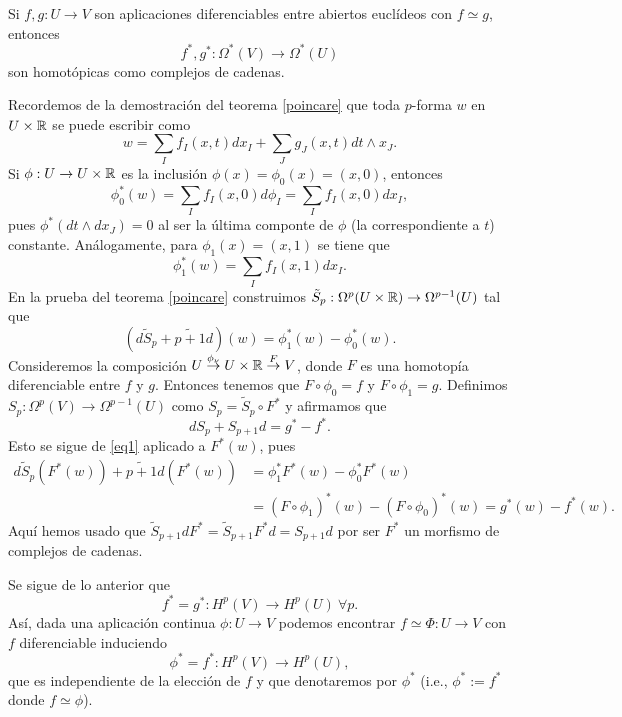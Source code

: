 \documentclass[CV.tex]{subfiles}
\begin{document}
\begin{teorema}
Si $f,g:U→V$ son aplicaciones diferenciables entre abiertos euclídeos con $f≃g$, entonces
$$f^*,g^*:Ω^*(V)→Ω^*(U)$$
son homotópicas como complejos de cadenas.
\end{teorema}
\begin{dem}
Recordemos de la demostración del teorema \ref{poincare} que toda $p$-forma $w$ en $U\times\mathbb{R}$ se puede escribir como 
\[
w=\sum_If_I(x,t)dx_I+\sum_Jg_J(x,t)dt\land x_J.
\]
Si $\phi:U\to U\times\mathbb{R}$ es la inclusión $\phi(x)=\phi_0(x)=(x,0)$, entonces
\[
\phi_0^*(w)=\sum_If_I(x,0)d\phi_I=\sum_I f_I(x,0)dx_I,
\]
pues $\phi^*(dt\land dx_J)=0$ al ser la última componte de $\phi$ (la correspondiente a $t$) constante. Análogamente, para $\phi_1(x)=(x,1)$ se tiene que
\[
\phi_1^*(w)=\sum_I f_I(x,1)dx_I.
\]
En la prueba del teorema \ref{poincare} construimos $\tilde{S}_p:\Omega^p(U\times\mathbb{R})\to \Omega^{p-1}(U)$ tal que 
\begin{equation}\label{eq1}
(d\tilde{S}_{p}+\tilde{p+1}d)(w)=\phi_1^*(w)-\phi_0^*(w).
\end{equation}
Consideremos la composición $U\overset{\phi_{\nu}}{\to}U\times\mathbb{R}\overset{F}{\to}V$, donde $F$ es una homotopía diferenciable entre $f$ y $g$. Entonces tenemos que $F\circ\phi_0=f$ y $F\circ \phi_1=g$. Definimos $S_p:\Omega^p(V)\to \Omega^{p-1}(U)$ como $S_p=\tilde{S}_p\circ F^*$ y afirmamos que
\[
dS_p+S_{p+1}d=g^*-f^*.
\]
Esto se sigue de \ref{eq1} aplicado a $F^*(w)$, pues 
\begin{align*}
d\tilde{S}_{p}(F^*(w))+\tilde{p+1}d(F^*(w))&=\phi_1^*F^*(w)-\phi_0^*F^*(w)\\
&=(F\circ\phi_1)^*(w)-(F\circ\phi_0)^*(w)=g^*(w)-f^*(w).
\end{align*}
Aquí hemos usado que $\tilde{S}_{p+1}dF^*=\tilde{S}_{p+1}F^*d=S_{p+1}d$ por ser $F^*$ un morfismo de complejos de cadenas.
\QED
\end{dem}

Se sigue de lo anterior que
$$f^*=g^*:H^p(V)→H^p(U)\ ∀p.$$
Así, dada una aplicación continua $ϕ:U→V$ podemos encontrar $f≃Φ:U→V$ con $f$ diferenciable induciendo
$$ϕ^*=f^*:H^p(V)→H^p(U),$$
que es independiente de la elección de $f$ y que denotaremos por $ϕ^*$ (i.e., $ϕ^*:=f^*$ donde $f≃ϕ$).
\end{document}
